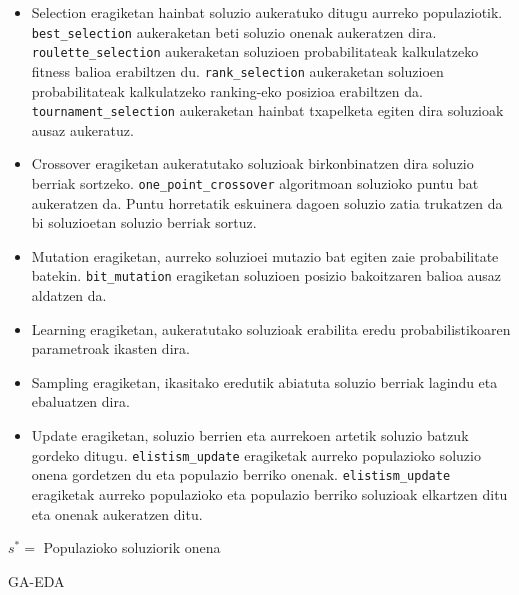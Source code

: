 \documentclass[sigconf]{acmart}
\begin{document}
\begin{itemize}
    \item Selection eragiketan hainbat soluzio aukeratuko ditugu aurreko populaziotik. \texttt{best\_selection} aukeraketan beti soluzio onenak aukeratzen dira.  \texttt{roulette\_selection} aukeraketan soluzioen probabilitateak kalkulatzeko fitness balioa erabiltzen du. \texttt{rank\_selection} aukeraketan soluzioen probabilitateak kalkulatzeko ranking-eko posizioa erabiltzen da. \texttt{tournament\_selection} aukeraketan hainbat txapelketa egiten dira soluzioak ausaz aukeratuz.
    \item Crossover eragiketan aukeratutako soluzioak birkonbinatzen dira soluzio berriak sortzeko. \texttt{one\_point\_crossover} algoritmoan soluzioko puntu bat aukeratzen da. Puntu horretatik eskuinera dagoen soluzio zatia trukatzen da bi soluzioetan soluzio berriak sortuz.
    \item Mutation eragiketan, aurreko soluzioei mutazio bat egiten zaie probabilitate batekin. \texttt{bit\_mutation} eragiketan soluzioen posizio bakoitzaren balioa ausaz aldatzen da.
    \item Learning eragiketan, aukeratutako soluzioak erabilita eredu probabilistikoaren parametroak ikasten dira.
    \item Sampling eragiketan, ikasitako eredutik abiatuta soluzio berriak lagindu eta ebaluatzen dira.
    \item Update eragiketan, soluzio berrien eta aurrekoen artetik soluzio batzuk gordeko ditugu. \texttt{elistism\_update} eragiketak aurreko populazioko soluzio onena gordetzen du eta populazio berriko onenak. \texttt{elistism\_update} eragiketak aurreko populazioko eta populazio berriko soluzioak elkartzen ditu eta onenak aukeratzen ditu.
\end{itemize}

\begin{algorithm}
    $s^* =$ Populazioko soluziorik onena
    \caption{GA-EDA}
    \label{alg:ga_eda}
\end{algorithm}
\end{document}
